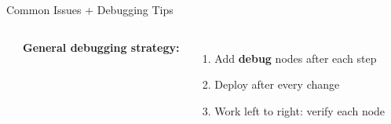 \documentclass[aspectratio=169,11pt]{beamer}
\begin{document}
\begin{frame}[shrink=10]{Common Issues + Debugging Tips}
\begin{columns}
\begin{itemize}
            \vspace{0.05cm}
        \end{itemize}

        \vspace{0.15cm}
        \textbf{General debugging strategy:}
        \begin{enumerate}
            \item Add \textbf{debug} nodes after each step
            \item Deploy after every change
            \item Work left to right: verify each node
        \end{enumerate}
    \end{columns}
\end{frame}
\end{document}
